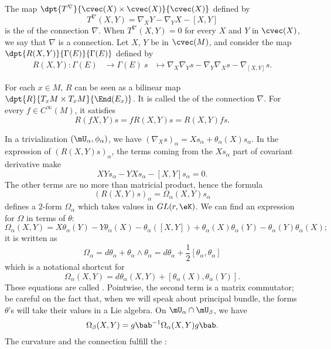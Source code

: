 The map $\dpt{T^{\nabla}}{\cvec(X)\times\cvec(X)}{\cvec(X)}$ defined by
\begin{equation}
     T^{\nabla}(X,Y)=\nabla_XY-\nabla_YX-[X,Y]\label{deftorsion}
\end{equation}
is the  of the connection $\nabla$. When $T^{\nabla}(X,Y)=0$ for every $X$ and $Y$ in $\cvec(X)$, we say that $\nabla$ is a  connection. Let $X$, $Y$ be in $\cvec(M)$, and consider the map $\dpt{R(X,Y)}{\Gamma(E)}{\Gamma(E)}$ defined by
		\begin{equation}
		\begin{aligned}
			R(X,Y) \colon \Gamma(E) &\to \Gamma(E)\
			s&\mapsto \nabla_X\nabla_Ys-\nabla_Y\nabla_Xs-\nabla_{[X,Y]}s.
		\end{aligned}
	\end{equation}

For each $x\in M$, $R$ can be seen as a bilinear map $\dpt{R}{T_xM\times T_xM}{\End(E_x)}$. It is called the  of the connection $\nabla$. For every $f\in C^{\infty}(M)$, it satisfies
\[
 R(fX,Y)s=fR(X,Y)s=R(X,Y)fs.
\]


In a trivialization $(\mU_{\alpha},\phi_{\alpha})$, we have $(\nabla_Xs)_{\alpha}=Xs_{\alpha}+\theta_{\alpha}(X)s_{\alpha}$. In the expression of $(R(X,Y)s)_{\alpha}$, the terms coming from the $Xs_{\alpha}$ part of covariant derivative make
\[
  XYs_{\alpha}-YXs_{\alpha}-[X,Y]s_{\alpha}=0.
\]
The other terms are no more than matricial product, hence the formula
\begin{equation}
  (R(X,Y)s)_{\alpha}=\Omega_{\alpha}(X,Y)s_{\alpha}
\end{equation}
 defines a $2$-form $\Omega_{\alpha}$ which takes values in $GL(r,\eK)$. We can find an expression for $\Omega$ in terms of $\theta$:
\[
  \Omega_{\alpha}(X,Y)=X\theta_{\alpha}(Y)-Y\theta_{\alpha}(X)-\theta_{\alpha}([X,Y])+\theta_{\alpha}(X)\theta_{\alpha}(Y)-\theta_{\alpha}(Y)\theta_{\alpha}(X);
\]
it is written as
\begin{equation}\label{eq:Omega_ttheta}
\Omega_{\alpha}=d\theta_{\alpha}+\theta_{\alpha}\wedge\theta_{\alpha}=d\theta_{\alpha}+\frac{1}{2}[\theta_{\alpha},\theta_{\alpha}]
\end{equation}
which is a notational shortcut for
\begin{equation}		\label{EaCurvdVVsq}
  \Omega_{\alpha}(X,Y)=d\theta_{\alpha}(X,Y)+[\theta_{\alpha}(X),\theta_{\alpha}(Y)].
\end{equation}
These equations are called . Pointwise, the second term is a matrix commutator; be careful on the fact that, when we will speak about principal bundle, the forms $\theta$'s will take their values in a Lie algebra. On $\mU_{\alpha}\cap\mU_{\beta}$, we have
\[
  \Omega_{\beta}(X,Y)=g\bab^{-1}\Omega_{\alpha}(X,Y)g\bab.
\]
The curvature and the connection fulfill the :

